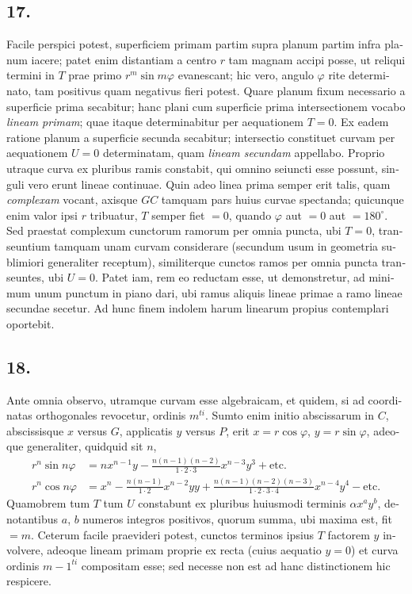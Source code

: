 \documentclass[12pt,a4paper]{article}
\begin{document}
\begin{otherlanguage}{latin}
\subsection*{17.}
Facile perspici potest, superficiem primam partim supra planum partim infra planum iacere; patet enim distantiam a centro $r$ tam magnam accipi posse, ut reliqui termini in $T$ prae primo $r^{m}\sin m\varphi$ evanescant; hic vero, angulo $\varphi$ rite determinato, tam positivus quam negativus fieri potest. Quare planum fixum necessario a superficie prima secabitur; hanc plani cum superficie prima intersectionem vocabo \textit{lineam primam}; quae itaque determinabitur per aequationem $T=0$. Ex eadem ratione planum a superficie secunda secabitur; intersectio constituet curvam per aequationem $U=0$ determinatam, quam \textit{lineam secundam} appellabo. Proprio utraque curva ex pluribus ramis constabit, qui omnino seiuncti esse possunt, singuli vero erunt lineae continuae. Quin adeo linea prima semper erit talis, quam \textit{complexam} vocant, axisque $GC$ tamquam pars huius curvae spectanda; quicunque enim valor ipsi $r$ tribuatur, $T$ semper fiet $=0$, quando $\varphi$ aut $=0$ aut $=180^{\circ}$. Sed praestat complexum cunctorum ramorum per omnia puncta, ubi $T=0$, transeuntium tamquam unam curvam considerare (secundum usum in geometria sublimiori generaliter receptum), similiterque cunctos ramos per omnia puncta transeuntes, ubi $U=0$. Patet iam, rem eo reductam esse, ut demonstretur, ad minimum unum punctum in piano dari, ubi ramus aliquis lineae primae a ramo lineae secundae secetur. Ad hunc finem indolem harum linearum propius contemplari oportebit.

\subsection*{18.}
Ante omnia observo, utramque curvam esse algebraicam, et quidem, si ad coordinatas orthogonales revocetur, ordinis $m^{ti}$. Sumto enim initio abscissarum in $C$, abscissisque $x$ versus $G$, applicatis $y$ versus $P$, erit $x=r\cos\varphi$, $y=r\sin\varphi$, adeoque generaliter, quidquid sit $n$,
\begin{align*}
r^{n}\sin n\varphi &= nx^{n-1}y-\frac{n(n-1)(n-2)}{1\cdot2\cdot3}x^{n-3}y^{3}+\text{etc.}\\
r^{n}\cos n\varphi &= x^{n}-\frac{n(n-1)}{1\cdot2}x^{n-2}yy+\frac{n(n-1)(n-2)(n-3)}{1\cdot2\cdot3\cdot4}x^{n-4}y^{4}-\text{etc.}
\end{align*}
Quamobrem tum $T$ tum $U$ constabunt ex pluribus huiusmodi terminis $\alpha x^{a}y^{b}$, denotantibus $a$, $b$ numeros integros positivos, quorum summa, ubi maxima est, fit $=m$. Ceterum facile praevideri potest, cunctos terminos ipsius $T$ factorem $y$ involvere, adeoque lineam primam proprie ex recta (cuius aequatio $y=0$) et curva ordinis $m-1^{ti}$ compositam esse; sed necesse non est ad hanc distinctionem hic respicere.


\end{otherlanguage}
\end{document}
